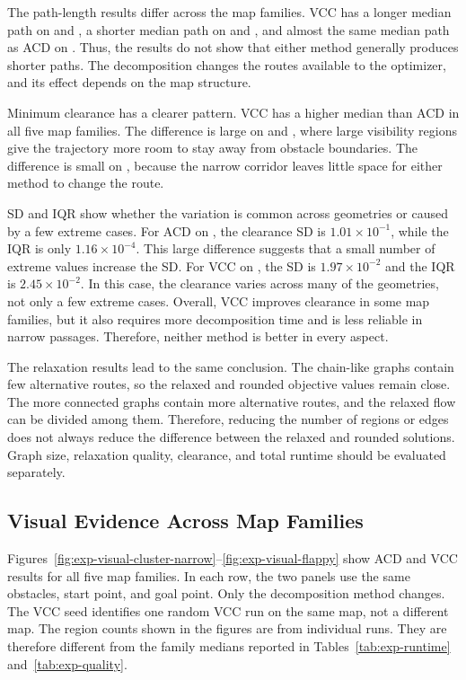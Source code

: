 The path-length results differ across the map families. VCC has a longer median
path on  and , a shorter median path on
 and , and almost the same median path as ACD on
. Thus, the results do not show that either method generally
produces shorter paths. The decomposition changes the routes available to the
optimizer, and its effect depends on the map structure.

Minimum clearance has a clearer pattern. VCC has a higher median than ACD in all
five map families. The difference is large on  and
, where large visibility regions give the trajectory more room
to stay away from obstacle boundaries. The difference is small on
, because the narrow corridor leaves little space for either
method to change the route.

SD and IQR show whether the variation is common across geometries or caused by
a few extreme cases. For ACD on , the clearance SD is
$1.01\times10^{-1}$, while the IQR is only $1.16\times10^{-4}$. This large
difference suggests that a small number of extreme values increase the SD. For
VCC on , the SD is $1.97\times10^{-2}$ and the IQR is
$2.45\times10^{-2}$. In this case, the clearance varies across many of the
geometries, not only a few extreme cases. Overall, VCC improves clearance in
some map families, but it also requires more decomposition time and is less
reliable in narrow passages. Therefore, neither method is better in every
aspect.

The relaxation results lead to the same conclusion. The chain-like
 graphs contain few alternative routes, so the relaxed and rounded
objective values remain close. The more connected  graphs
contain more alternative routes, and the relaxed flow can be divided among
them. Therefore, reducing the number of regions or edges does not always reduce
the difference between the relaxed and rounded solutions. Graph size,
relaxation quality, clearance, and total runtime should be evaluated
separately.

\subsection{Visual Evidence Across Map Families}
Figures~\ref{fig:exp-visual-cluster-narrow}--\ref{fig:exp-visual-flappy}
show ACD and VCC results for all five map families. In each row, the two panels
use the same obstacles, start point, and goal point. Only the decomposition
method changes. The VCC seed identifies one random VCC run on the same map, not
a different map. The region counts shown in the figures are from individual
runs. They are therefore different from the family medians reported in
Tables~\ref{tab:exp-runtime} and~\ref{tab:exp-quality}.

